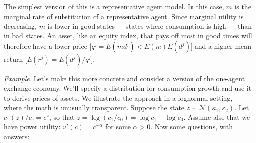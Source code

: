 \documentclass[11pt]{article}
\begin{document}
The simplest version of this is a representative agent model.
In this case, $m$ is the marginal rate of substitution of a representative agent.
Since marginal utility is decreasing, $m$ is lower in
good states --- states where consumption is high ---
than in bad states.
An asset, like an equity index, that pays off most in good times
will therefore have a lower price [$q^j = E(md^j) < E(m) E(d^j)$]
and a higher mean return [$E(r^j) = E(d^j)/q^j$].


{\it Example.\/}
Let's make this more concrete and consider a version of the one-agent exchange economy.
We'll specify a distribution for consumption growth
and use it to derive prices of assets.
We illustrate the approach in a lognormal setting, where the math is unusually transparent.
Suppose the state $z \sim \mathcal{N}(\kappa_1,\kappa_2)$.
Let $c_1(z)/c_0 = e^z$, so that $z = \log (c_1/c_0) = \log c_1 - \log c_0$.
Assume also that we have power utility:
$u'(c) = c^{-\alpha}$ for some $\alpha > 0$.
Now some questions, with answers:
\end{document}
